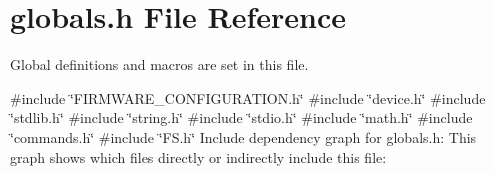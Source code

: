 \section{globals.\+h File Reference}
\label{globals_8h}


Global definitions and macros are set in this file.  


{\ttfamily \#include \char`\"{}F\+I\+R\+M\+W\+A\+R\+E\+\_\+\+C\+O\+N\+F\+I\+G\+U\+R\+A\+T\+I\+O\+N.\+h\char`\"{}}\newline
{\ttfamily \#include \char`\"{}device.\+h\char`\"{}}\newline
{\ttfamily \#include \char`\"{}stdlib.\+h\char`\"{}}\newline
{\ttfamily \#include \char`\"{}string.\+h\char`\"{}}\newline
{\ttfamily \#include \char`\"{}stdio.\+h\char`\"{}}\newline
{\ttfamily \#include \char`\"{}math.\+h\char`\"{}}\newline
{\ttfamily \#include \char`\"{}commands.\+h\char`\"{}}\newline
{\ttfamily \#include \char`\"{}F\+S.\+h\char`\"{}}\newline
Include dependency graph for globals.\+h\+:
This graph shows which files directly or indirectly include this file\+:
